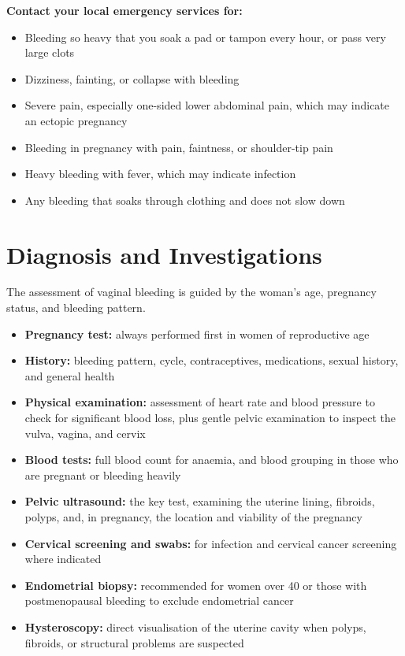 \textbf{Contact your local emergency services for:}
\begin{itemize}
    \item Bleeding so heavy that you soak a pad or tampon every hour, or pass very large clots
    \item Dizziness, fainting, or collapse with bleeding
    \item Severe pain, especially one-sided lower abdominal pain, which may indicate an ectopic pregnancy
    \item Bleeding in pregnancy with pain, faintness, or shoulder-tip pain
    \item Heavy bleeding with fever, which may indicate infection
    \item Any bleeding that soaks through clothing and does not slow down
\end{itemize}

\section*{Diagnosis and Investigations}
The assessment of vaginal bleeding is guided by the woman's age, pregnancy status, and bleeding pattern.

\begin{itemize}
    \item \textbf{Pregnancy test:} always performed first in women of reproductive age
    \item \textbf{History:} bleeding pattern, cycle, contraceptives, medications, sexual history, and general health
    \item \textbf{Physical examination:} assessment of heart rate and blood pressure to check for significant blood loss, plus gentle pelvic examination to inspect the vulva, vagina, and cervix
    \item \textbf{Blood tests:} full blood count for anaemia, and blood grouping in those who are pregnant or bleeding heavily
    \item \textbf{Pelvic ultrasound:} the key test, examining the uterine lining, fibroids, polyps, and, in pregnancy, the location and viability of the pregnancy
    \item \textbf{Cervical screening and swabs:} for infection and cervical cancer screening where indicated
    \item \textbf{Endometrial biopsy:} recommended for women over 40 or those with postmenopausal bleeding to exclude endometrial cancer
    \item \textbf{Hysteroscopy:} direct visualisation of the uterine cavity when polyps, fibroids, or structural problems are suspected
\end{itemize}

